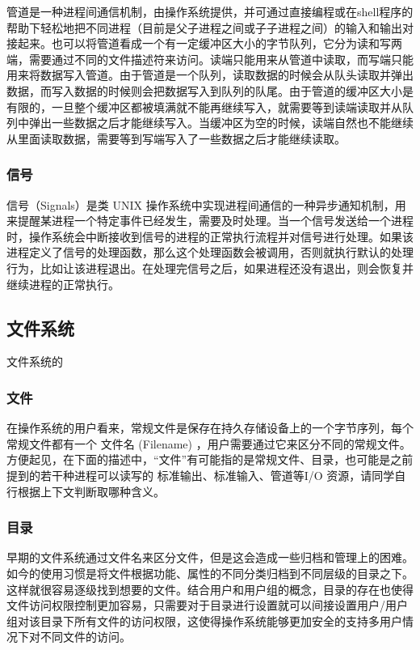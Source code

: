 管道是一种进程间通信机制，由操作系统提供，并可通过直接编程或在shell程序的帮助下轻松地把不同进程（目前是父子进程之间或子子进程之间）的输入和输出对接起来。也可以将管道看成一个有一定缓冲区大小的字节队列，它分为读和写两端，需要通过不同的文件描述符来访问。读端只能用来从管道中读取，而写端只能用来将数据写入管道。由于管道是一个队列，读取数据的时候会从队头读取并弹出数据，而写入数据的时候则会把数据写入到队列的队尾。由于管道的缓冲区大小是有限的，一旦整个缓冲区都被填满就不能再继续写入，就需要等到读端读取并从队列中弹出一些数据之后才能继续写入。当缓冲区为空的时候，读端自然也不能继续从里面读取数据，需要等到写端写入了一些数据之后才能继续读取。

\subsubsection{信号}

信号（Signals）是类 UNIX 操作系统中实现进程间通信的一种异步通知机制，用来提醒某进程一个特定事件已经发生，需要及时处理。当一个信号发送给一个进程时，操作系统会中断接收到信号的进程的正常执行流程并对信号进行处理。如果该进程定义了信号的处理函数，那么这个处理函数会被调用，否则就执行默认的处理行为，比如让该进程退出。在处理完信号之后，如果进程还没有退出，则会恢复并继续进程的正常执行。

\subsection{文件系统}

文件系统的

\subsubsection{文件}

在操作系统的用户看来，常规文件是保存在持久存储设备上的一个字节序列，每个常规文件都有一个 文件名 (Filename) ，用户需要通过它来区分不同的常规文件。方便起见，在下面的描述中，“文件”有可能指的是常规文件、目录，也可能是之前提到的若干种进程可以读写的 标准输出、标准输入、管道等I/O 资源，请同学自行根据上下文判断取哪种含义。

\subsubsection{目录}

早期的文件系统通过文件名来区分文件，但是这会造成一些归档和管理上的困难。如今的使用习惯是将文件根据功能、属性的不同分类归档到不同层级的目录之下。这样就很容易逐级找到想要的文件。结合用户和用户组的概念，目录的存在也使得文件访问权限控制更加容易，只需要对于目录进行设置就可以间接设置用户/用户组对该目录下所有文件的访问权限，这使得操作系统能够更加安全的支持多用户情况下对不同文件的访问。

